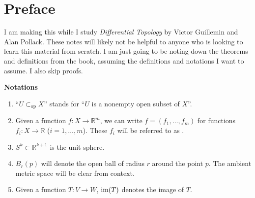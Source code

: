 \documentclass[12pt]{article}
\newcommand{\opsub}{\subset_{\operatorname{op}}}
\begin{document}
\coverpage
\thispagestyle{empty}
\updated{\today}
\thispagestyle{empty}
\tableofcontents
\pagestyle{fancy}
\setcounter{page}{1}
\setcounter{section}{-1}

\section{Preface}

I am making this while I study \emph{Differential Topology} by Victor Guillemin and Alan Pollack. These notes will likely not be helpful to anyone who is looking to learn this material from scratch. I am just going to be noting down the theorems and definitions from the book, assuming the definitions and notations I want to assume. I also skip proofs.

\textbf{Notations}
\begin{enumerate}
	\item ``$U \opsub X$'' stands for ``$U$ is a nonempty open subset of $X$''.
	\item Given a function $f : X \to \mathbb{R}^{m}$, we can write $f = (f_{1}, \ldots, f_{m})$ for functions $f_{i} : X \to \mathbb{R}$ ($i = 1, \ldots, m$). These $f_{i}$ will be referred to as .
	\item $S^{k} \subset \mathbb{R}^{k + 1}$ is the unit sphere.
	\item $B_{r}(p)$ will denote the open ball of radius $r$ around the point $p$. The ambient metric space will be clear from context.
	\item Given a function $T : V \to W$, $\operatorname{im}(T)$ denotes the image of $T$.
\end{enumerate}


\end{document}
